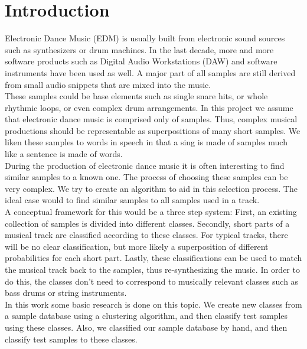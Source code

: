 \section{Introduction}
\label{sec:Introduction}
Electronic Dance Music (EDM) is usually built from electronic sound sources such as synthesizers or drum machines. In the last decade, more and more software products such as Digital Audio Workstations (DAW) and software instruments have been used as well. A major part of all samples are still derived from small audio snippets that are mixed into the music.\\
These samples could be base elements such as single snare hits, or whole rhythmic loops, or even complex drum arrangements. In this project we assume that electronic dance music is comprised only of samples. Thus, complex musical productions should be representable as superpositions of many short samples. We liken these samples to words in speech in that a sing is made of samples much like a sentence is made of words.\\
During the production of electronic dance music it is often interesting to find similar samples to a known one. The process of choosing these samples can be very complex. We try to create an algorithm to aid in this selection process. The ideal case would to find similar samples to all samples used in a track. \\
A conceptual framework for this would be a three step system: First, an existing collection of samples is divided into different classes. Secondly, short parts of a musical track are classified according to these classes. For typical tracks, there will be no clear classification, but more likely a superposition of different probabilities for each short part. Lastly, these classifications can be used to match the musical track back to the samples, thus re-synthesizing the music. In order to do this, the classes don't need to correspond to musically relevant classes such as bass drums or string instruments.\\
In this work some basic research is done on this topic. We create new classes from a sample database using a clustering algorithm, and then classify test samples using these classes. Also, we classified our sample database by hand, and then classify test samples to these classes.

